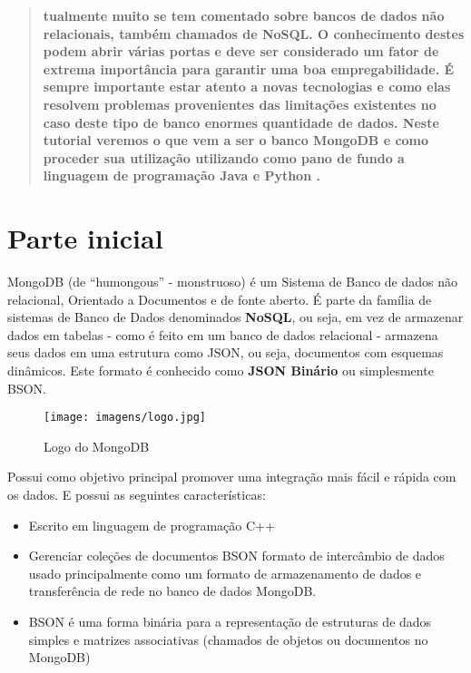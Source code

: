 \documentclass[a4paper,11pt]{article}
\begin{document}
	
\maketitle %
\thispagestyle{fancy} %

	
\begin{abstract}
	\textbf{tualmente muito se tem comentado sobre bancos de dados não relacionais, também chamados de NoSQL. O conhecimento destes podem abrir várias portas e deve ser considerado um fator de extrema importância para garantir uma boa empregabilidade. É sempre importante estar atento a novas tecnologias e como elas resolvem problemas provenientes das limitações existentes no caso deste tipo de banco enormes quantidade de dados. Neste tutorial veremos o que vem a ser o banco MongoDB \cite{mongooficial} e como proceder sua utilização utilizando como pano de fundo a linguagem de programação Java \cite{javaoficial} e Python \cite{pythonoficial}.}
\end{abstract}


\section{Parte inicial}
MongoDB (de ``humongous'' - monstruoso) é um Sistema de Banco de dados não relacional, Orientado a Documentos e de fonte aberto. É parte da família de sistemas de Banco de Dados denominados \textbf{NoSQL}, ou seja, em vez de armazenar dados em tabelas - como é feito em um banco de dados relacional - armazena seus dados em uma estrutura como JSON, ou seja, documentos com esquemas dinâmicos. Este formato é conhecido como \textbf{JSON Binário} ou simplesmente BSON.
\begin{figure}[H]
	\centering
	\texttt{[image: imagens/logo.jpg]}
	\caption{Logo do MongoDB}
\end{figure}

Possui como objetivo principal promover uma integração mais fácil e rápida com os dados. E possui as seguintes características:
\begin{itemize}[nolistsep]
  \item Escrito em linguagem de programação C++
  \item Gerenciar coleções de documentos BSON formato de intercâmbio de dados usado principalmente como um formato de armazenamento de dados e transferência de rede no banco de dados MongoDB.
  \item BSON é uma forma binária para a representação de estruturas de dados simples e matrizes associativas (chamados de objetos ou documentos no MongoDB)
\end{itemize}
\end{document}
